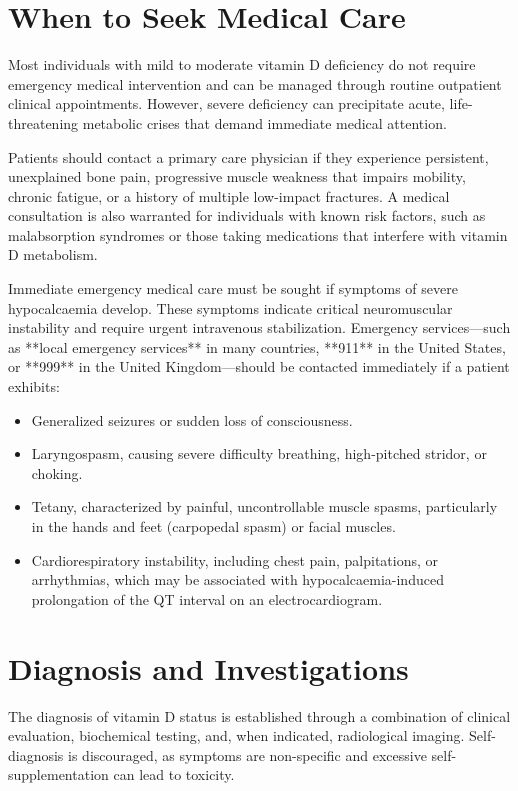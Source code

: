 \section*{When to Seek Medical Care}
Most individuals with mild to moderate vitamin D deficiency do not require emergency medical intervention and can be managed through routine outpatient clinical appointments. However, severe deficiency can precipitate acute, life-threatening metabolic crises that demand immediate medical attention.

Patients should contact a primary care physician if they experience persistent, unexplained bone pain, progressive muscle weakness that impairs mobility, chronic fatigue, or a history of multiple low-impact fractures. A medical consultation is also warranted for individuals with known risk factors, such as malabsorption syndromes or those taking medications that interfere with vitamin D metabolism.

Immediate emergency medical care must be sought if symptoms of severe hypocalcaemia develop. These symptoms indicate critical neuromuscular instability and require urgent intravenous stabilization. Emergency services---such as **local emergency services** in many countries, **911** in the United States, or **999** in the United Kingdom---should be contacted immediately if a patient exhibits:
\begin{itemize}
    \item Generalized seizures or sudden loss of consciousness.
    \item Laryngospasm, causing severe difficulty breathing, high-pitched stridor, or choking.
    \item Tetany, characterized by painful, uncontrollable muscle spasms, particularly in the hands and feet (carpopedal spasm) or facial muscles.
    \item Cardiorespiratory instability, including chest pain, palpitations, or arrhythmias, which may be associated with hypocalcaemia-induced prolongation of the QT interval on an electrocardiogram.
\end{itemize}

\section*{Diagnosis and Investigations}
The diagnosis of vitamin D status is established through a combination of clinical evaluation, biochemical testing, and, when indicated, radiological imaging. Self-diagnosis is discouraged, as symptoms are non-specific and excessive self-supplementation can lead to toxicity.

